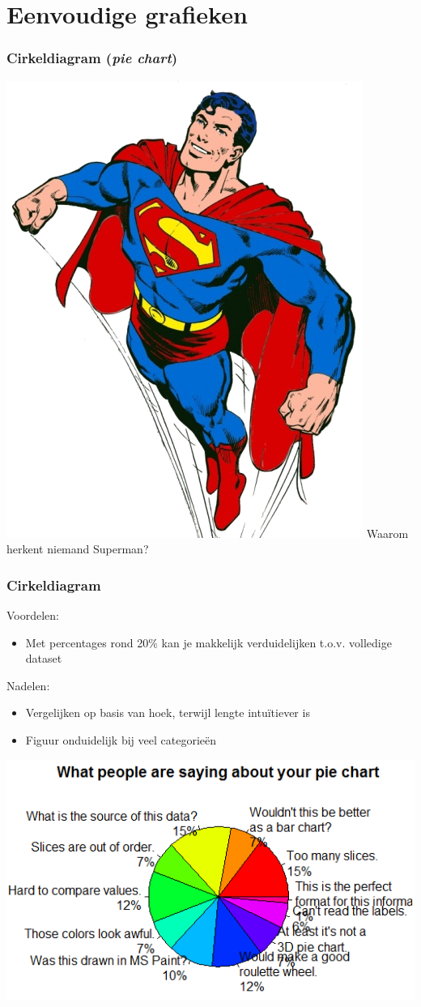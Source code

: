 \documentclass{beamer}
\begin{document}
\begin{frame}[plain]

\end{frame}

\section{Eenvoudige grafieken}
\sectionframelogo{}

\begin{frame}
  \frametitle{Cirkeldiagram (\emph{pie chart})}

  \centering
  \includegraphics[width=.8cm]{img/les2-hero-3}
  Waarom herkent niemand Superman?

\end{frame}

\begin{frame}
  \frametitle{Cirkeldiagram}

  Voordelen:
  \begin{itemize}
    \item Met percentages rond 20\% kan je makkelijk verduidelijken t.o.v. volledige dataset
  \end{itemize}
  Nadelen:
  \begin{itemize}
    \item Vergelijken op basis van hoek, terwijl lengte intuïtiever is
    \item Figuur onduidelijk bij veel categorieën
  \end{itemize}

  \begin{center}
  \includegraphics[width=.6\textwidth]{img/pie-chart.png}
  \end{center}

\end{frame}
\end{document}
